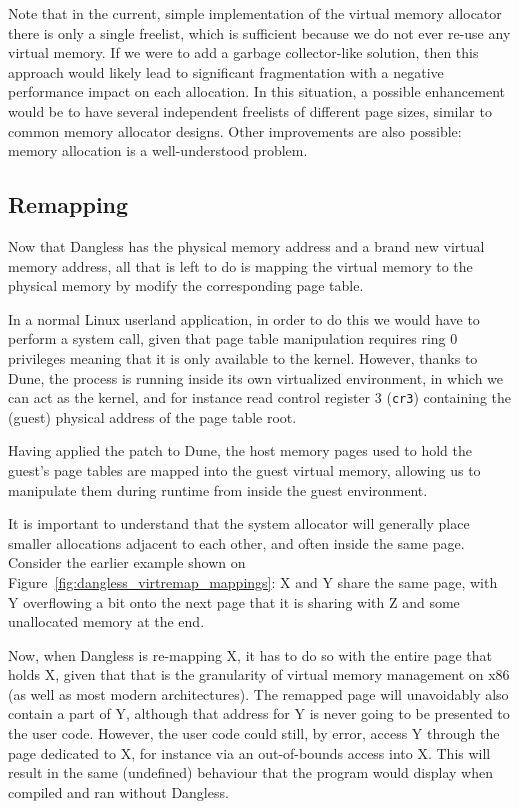 Note that in the current, simple implementation of the virtual memory allocator there is only a single freelist, which is sufficient because we do not ever re-use any virtual memory. If we were to add a garbage collector-like solution, then this approach would likely lead to significant fragmentation with a negative performance impact on each allocation. In this situation, a possible enhancement would be to have several independent freelists of different page sizes, similar to common memory allocator designs. Other improvements are also possible: memory allocation is a well-understood problem.

\subsection{Remapping}
\label{ssec:remapping}

Now that Dangless has the physical memory address and a brand new virtual memory address, all that is left to do is mapping the virtual memory to the physical memory by modify the corresponding page table.

In a normal Linux userland application, in order to do this we would have to perform a system call, given that page table manipulation requires ring 0 privileges meaning that it is only available to the kernel. However, thanks to Dune, the process is running inside its own virtualized environment, in which we can act as the kernel, and for instance read control register 3 (\lstinline!cr3!) containing the (guest) physical address of the page table root.

Having applied the  patch to Dune, the host memory pages used to hold the guest's page tables are mapped into the guest virtual memory, allowing us to manipulate them during runtime from inside the guest environment.

It is important to understand that the system allocator will generally place smaller allocations adjacent to each other, and often inside the same page. Consider the earlier example shown on Figure~\ref{fig:dangless_virtremap_mappings}: X and Y share the same page, with Y overflowing a bit onto the next page that it is sharing with Z and some unallocated memory at the end.

Now, when Dangless is re-mapping X, it has to do so with the entire page that holds X, given that that is the granularity of virtual memory management on x86 (as well as most modern architectures). The remapped page will unavoidably also contain a part of Y, although that address for Y is never going to be presented to the user code. However, the user code could still, by error, access Y through the page dedicated to X, for instance via an out-of-bounds access into X. This will result in the same (undefined) behaviour that the program would display when compiled and ran without Dangless.


